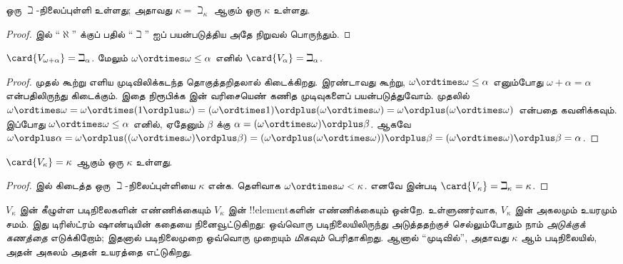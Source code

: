 \documentclass[../../../include/open-logic-section]{subfiles}
\begin{document}
\begin{prop}
ஒரு $\beth$-நிலைப்புள்ளி உள்ளது; அதாவது $\kappa=
\beth_\kappa$ ஆகும் ஒரு $\kappa$ உள்ளது.
\end{prop}

\begin{proof}
 இல் ``$\aleph$'' க்குப் பதில்
``$\beth$'' ஐப் பயன்படுத்திய அதே நிறுவல் பொருந்தும்.
\end{proof}

\begin{prop}
$\card{V_{\omega+\alpha}} = \beth_{\alpha}$. மேலும்
$\omega \ordtimes \omega \leq \alpha$ எனில்
$\card{V_\alpha} = \beth_\alpha$.
\end{prop}

\begin{proof}
முதல் கூற்று எளிய முடிவிலிக்கடந்த தொகுத்தறிதலால் கிடைக்கிறது.
இரண்டாவது கூற்று, $\omega \ordtimes \omega \leq \alpha$
எனும்போது $\omega + \alpha = \alpha$ என்பதிலிருந்து கிடைக்கும்.
இதை நிரூபிக்க  இன் வரிசையெண்
கணித முடிவுகளைப் பயன்படுத்துவோம். முதலில்
$\omega \ordtimes \omega = \omega \ordtimes (1 \ordplus \omega) =
(\omega  \ordtimes 1) \ordplus (\omega\ordtimes\omega) = \omega
\ordplus (\omega \ordtimes \omega)$ என்பதை கவனிக்கவும். இப்போது
$\omega \ordtimes \omega \leq \alpha$ எனில், ஏதேனும் $\beta$
க்கு $\alpha = (\omega\ordtimes\omega) \ordplus \beta$.
ஆகவே $\omega \ordplus \alpha = \omega \ordplus
((\omega \ordtimes \omega) \ordplus \beta) = (\omega \ordplus (\omega
\ordtimes \omega)) \ordplus \beta = (\omega \ordtimes \omega) \ordplus
\beta = \alpha$.
\end{proof}

\begin{cor}
$\card{V_\kappa} = \kappa$ ஆகும் ஒரு $\kappa$ உள்ளது.
\end{cor}

\begin{proof}
 இல் கிடைத்த ஒரு $\beth$-நிலைப்புள்ளியை
$\kappa$ என்க. தெளிவாக $\omega \ordtimes \omega < \kappa$.
எனவே  இன்படி
$\card{V_\kappa} = \beth_\kappa= \kappa$.
\end{proof}

$V_\kappa$ இன் கீழுள்ள படிநிலைகளின் எண்ணிக்கையும்
$V_\kappa$ இன் !!{element}களின் எண்ணிக்கையும் ஒன்றே.
உள்ளுணர்வாக, $V_\kappa$ இன் அகலமும் உயரமும் சமம்.
இது டிரிஸ்ட்ரம் ஷாண்டியின் கதையை நினைவூட்டுகிறது: ஒவ்வொரு
படிநிலையிலிருந்து அடுத்ததற்குச் செல்லும்போதும் நாம்
\emph{அடுக்குக் கணத்தை} எடுக்கிறோம்; இதனால் படிநிலைமுறை
ஒவ்வொரு முறையும் \emph{மிகவும்} பெரிதாகிறது. ஆனால்
``முடிவில்'', அதாவது $\kappa$ ஆம் படிநிலையில், அதன் அகலம்
அதன் உயரத்தை எட்டுகிறது.
\end{document}

